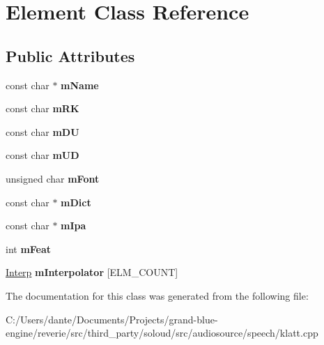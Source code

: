 \hypertarget{class_element}{}\section{Element Class Reference}
\label{class_element}
\subsection*{Public Attributes}
\begin{DoxyCompactItemize}
\item 
\mbox{\label{class_element_ae2a76532b8f53e0710b1f7d777fd13bb}} 
const char $\ast$ {\bfseries m\+Name}
\item 
\mbox{\label{class_element_a38ce3cc21317fef0ec6e46d34047c141}} 
const char {\bfseries m\+RK}
\item 
\mbox{\label{class_element_ac4ac7c604a9244acd5bb8e238b4e88ca}} 
const char {\bfseries m\+DU}
\item 
\mbox{\label{class_element_a281de25997f1d14588ebe8721bc4f472}} 
const char {\bfseries m\+UD}
\item 
\mbox{\label{class_element_a77029a35d5211a6c44bdafa798e35b04}} 
unsigned char {\bfseries m\+Font}
\item 
\mbox{\label{class_element_a2e6edaf921896065342db4dbefca749d}} 
const char $\ast$ {\bfseries m\+Dict}
\item 
\mbox{\label{class_element_add3c59ceec9d0e3a83fcee6f50d68563}} 
const char $\ast$ {\bfseries m\+Ipa}
\item 
\mbox{\label{class_element_aaf8e1e35e4c4ba836d30112fea3b074d}} 
int {\bfseries m\+Feat}
\item 
\mbox{\label{class_element_a50bb2961548d7002b4f48389f501c1fb}} 
\mbox{\hyperlink{class_interp}{Interp}} {\bfseries m\+Interpolator} \mbox{[}E\+L\+M\+\_\+\+C\+O\+U\+NT\mbox{]}
\end{DoxyCompactItemize}


The documentation for this class was generated from the following file\+:\begin{DoxyCompactItemize}
\item 
C\+:/\+Users/dante/\+Documents/\+Projects/grand-\/blue-\/engine/reverie/src/third\+\_\+party/soloud/src/audiosource/speech/klatt.\+cpp\end{DoxyCompactItemize}
